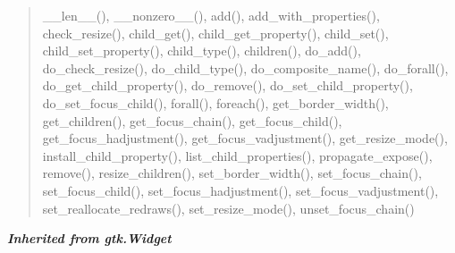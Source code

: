 \begin{quote}
\_\_len\_\_(), \_\_nonzero\_\_(), add(), add\_with\_properties(), check\_resize(), child\_get(), child\_get\_property(), child\_set(), child\_set\_property(), child\_type(), children(), do\_add(), do\_check\_resize(), do\_child\_type(), do\_composite\_name(), do\_forall(), do\_get\_child\_property(), do\_remove(), do\_set\_child\_property(), do\_set\_focus\_child(), forall(), foreach(), get\_border\_width(), get\_children(), get\_focus\_chain(), get\_focus\_child(), get\_focus\_hadjustment(), get\_focus\_vadjustment(), get\_resize\_mode(), install\_child\_property(), list\_child\_properties(), propagate\_expose(), remove(), resize\_children(), set\_border\_width(), set\_focus\_chain(), set\_focus\_child(), set\_focus\_hadjustment(), set\_focus\_vadjustment(), set\_reallocate\_redraws(), set\_resize\_mode(), unset\_focus\_chain()
\end{quote}

\large{\textbf{\textit{Inherited from gtk.Widget}}}

